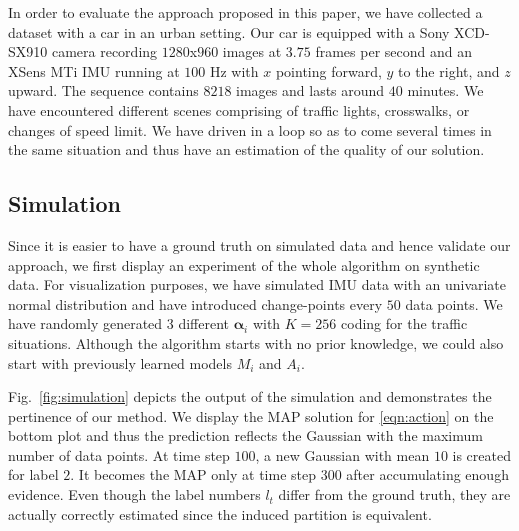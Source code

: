 In order to evaluate the approach proposed in this paper, we have collected
a dataset with a car in an urban setting. Our car is equipped with a Sony
XCD-SX910 camera recording $1280$x$960$ images at $3.75$ frames per second and
an XSens MTi IMU running at $100$ Hz with $x$ pointing forward, $y$ to the
right, and $z$ upward. The sequence contains $8218$ images and lasts around $40$
minutes. We have encountered different scenes comprising of traffic lights,
crosswalks, or changes of speed limit. We have driven in a loop so as to come
several times in the same situation and thus have an estimation of the quality
of our solution.

\subsection{Simulation}
Since it is easier to have a ground truth on simulated data and hence validate
our approach, we first display an experiment of the whole algorithm on synthetic
data. For visualization purposes, we have simulated IMU data with an univariate
normal distribution and have introduced change-points every $50$ data points. We
have randomly generated 3 different $\boldsymbol{\alpha}_i$ with $K=256$ coding
for the traffic situations. Although the algorithm starts with no prior
knowledge, we could also start with previously learned models $M_i$ and $A_i$.

Fig.~\ref{fig:simulation} depicts the output of the simulation and demonstrates
the pertinence of our method. We display the MAP solution for \eqref{eqn:action}
on the bottom plot and thus the prediction reflects the Gaussian with the
maximum number of data points. At time step $100$, a new Gaussian with mean
$10$ is created for label $2$. It becomes the MAP only at time step $300$ after
accumulating enough evidence. Even though the label numbers $l_t$ differ from
the ground truth, they are actually correctly estimated since the induced
partition is equivalent.

